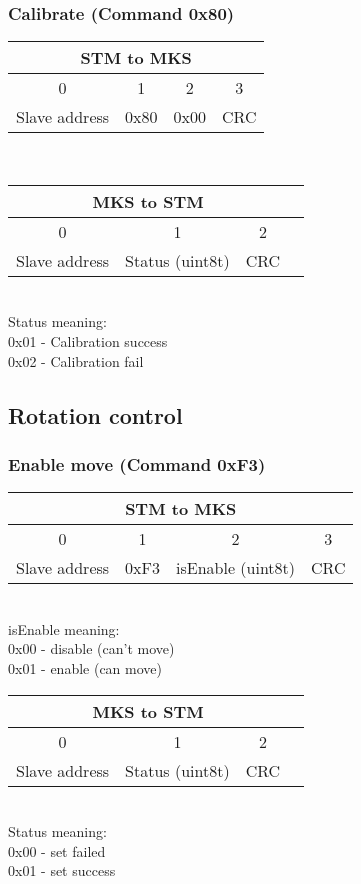 \documentclass[]{article}
\begin{document}
		\subsubsection*{Calibrate (Command 0x80)}
	\begin{tabular}{|c|c|c|c|}
		\hline
		\multicolumn{4}{|c|}{STM to MKS} \\ \hline
		0 & 1 & 2 & 3\\ \hline
		Slave address & 0x80 & 0x00 & CRC \\ \hline		
	\end{tabular} 
	\\
	\begin{tabular}{|c|c|c|c|}
		\hline
		\multicolumn{3}{|c|}{MKS to STM} \\ \hline
		0 & 1 & 2  \\ \hline
		Slave address & Status (uint8t) & CRC \\ \hline
	\end{tabular}\\
	Status meaning:\\
	0x01 - Calibration success \\
	0x02 - Calibration fail
	\subsection{Rotation control}
	\subsubsection*{Enable move (Command 0xF3)}
	\begin{tabular}{|c|c|c|c|}
		\hline
		\multicolumn{4}{|c|}{STM to MKS} \\ \hline
		0 & 1 & 2 & 3\\ \hline
		Slave address & 0xF3 & isEnable (uint8t) & CRC \\ \hline		
	\end{tabular}\\ 
	isEnable meaning:\\
	0x00 - disable (can't move)\\
	0x01 - enable (can move)
	\\
	\begin{tabular}{|c|c|c|c|}
		\hline
		\multicolumn{3}{|c|}{MKS to STM} \\ \hline
		0 & 1 & 2  \\ \hline
		Slave address & Status (uint8t) & CRC \\ \hline
	\end{tabular}\\
	Status meaning:\\
	0x00 - set failed \\
	0x01 - set success 
\end{document}
